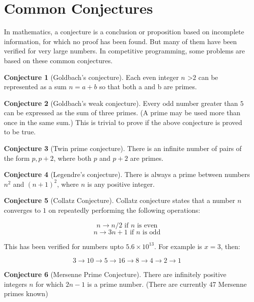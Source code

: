 \documentclass[twoside,12pt,a4paper,english]{book}
\theoremstyle{definition}
\theoremstyle{problemstyle}
\newtheorem{conjecture}{Conjecture}
\begin{document}
\section{Common Conjectures}
In mathematics, a conjecture is a conclusion or proposition based on incomplete information, for which no proof has been found. But many of them have been verified for very large numbers. In competitive programming, some problems are based on these common conjectures.

\begin{conjecture}[Goldbach’s conjecture]
Each even integer $n$ \textgreater $2$ can be represented as a sum $n = a+ b$ so that both a and b are primes.
\end{conjecture}
\begin{conjecture}[Goldbach's weak conjecture]
Every odd number greater than $5$ can be expressed as the sum of three primes. (A prime may be used more than once in the same sum.) This is trivial to prove if the above conjecture is proved to be true.
\end{conjecture}
\begin{conjecture}[Twin prime conjecture]
There is an infinite number of pairs of the form ${p, p +2}$, where both $p$ and $p+2$ are primes.
\end{conjecture}
\begin{conjecture}[Legendre’s conjecture]
 There is always a prime between numbers $n^2$ and $(n+1)^2$, where $n$ is any positive integer.
\end{conjecture}
\begin{conjecture}[Collatz Conjecture]
Collatz conjecture states that a number $n$ converges to $1$ on repeatedly performing the following operations:

$$n \rightarrow n/2 \text{ if }n \text{ is even}$$
$$n \rightarrow 3n+1 \text{ if }n \text{ is odd}$$

This has been verified for numbers upto $5.6 \times 10^{13}$. For example is $x = 3$, then:

$$3 \rightarrow 10 \rightarrow 5 \rightarrow 16 \rightarrow 8 \rightarrow 4 \rightarrow 2 \rightarrow 1$$
\end{conjecture}

\begin{conjecture}[Mersenne Prime Conjecture]
There are infinitely positive integers $n$ for which $2n - 1$ is a prime number. (There are currently 47 Mersenne primes known)
\end{conjecture}
\newpage
\end{document}
